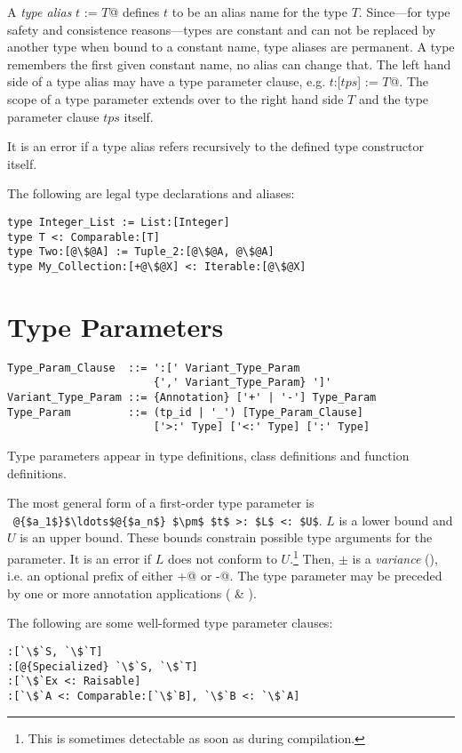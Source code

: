 A {\em type alias} \lstinline@type $t$ := $T$@ defines $t$ to be an alias name for the type $T$. Since---for type safety and consistence reasons---types are constant and can not be replaced by another type when bound to a constant name, type aliases are permanent. A type remembers the first given constant name, no alias can change that. The left hand side of a type alias may have a type parameter clause, e.g. \lstinline@type $t$:[$tps$] := $T$@. The scope of a type parameter extends over to the right hand side $T$ and the type parameter clause $tps$ itself. 

It is an error if a type alias refers recursively to the defined type constructor itself. 

\example The following are legal type declarations and aliases:
\begin{lstlisting}[escapechar=@]
type Integer_List := List:[Integer]
type T <: Comparable:[T]
type Two:[@\$@A] := Tuple_2:[@\$@A, @\$@A]
type My_Collection:[+@\$@X] <: Iterable:[@\$@X]
\end{lstlisting}

\section{Type Parameters}

\syntax\begin{lstlisting}
Type_Param_Clause  ::= ':[' Variant_Type_Param 
                       {',' Variant_Type_Param} ']'
Variant_Type_Param ::= {Annotation} ['+' | '-'] Type_Param
Type_Param         ::= (tp_id | '_') [Type_Param_Clause]
                       ['>:' Type] ['<:' Type] [':' Type]
\end{lstlisting}

Type parameters appear in type definitions, class definitions and function definitions. 

The most general form of a first-order type parameter is ~\lstinline!@{$a_1$}$\ldots$@{$a_n$} $\pm$ $t$ >: $L$ <: $U$!. $L$ is a lower bound and $U$ is an upper bound. These bounds constrain possible type arguments for the parameter. It is an error if $L$ does not conform to $U$.\footnote{This is sometimes detectable as soon as during compilation.} Then, $\pm$ is a {\em variance} (), i.e. an optional prefix of either \lstinline@+@ or \lstinline@-@. The type parameter may be preceded by one or more annotation applications ( \& ).

\example The following are some well-formed type parameter clauses:
\begin{lstlisting}[escapechar=`]
:[`\$`S, `\$`T]
:[@{Specialized} `\$`S, `\$`T]
:[`\$`Ex <: Raisable]
:[`\$`A <: Comparable:[`\$`B], `\$`B <: `\$`A]
\end{lstlisting}


